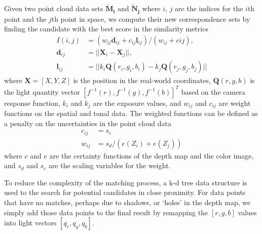 Given two point cloud data sets  $\mathbf{\tilde{M}_{i}}$ and $\mathbf{\tilde{N}_{j}}$ where $i$, $j$ are the indices for the $i$th point and the $j$th point in space, we compute their new correspondence sets by finding the candidate with the best score in the similarity metrics 
\begin{equation}
\label{eq_match_3d_point} 
\begin{split}
I(i,j) &= (w_{ij}\mathbf{d}_{ij} + c_{ij}\mathbf{l}_{ij})/(w_{ij} + c{ij}), \\
\mathbf{d}_{ij} &= || \mathbf{X}_i - \mathbf{X}_j ||, \\
\mathbf{l}_{ij} &= ||{k_i\mathbf{Q}(r_i,g_i,b_i)-k_j\mathbf{Q}(r_j,g_j,b_j)}||
\end{split}
\end{equation}
where $\mathbf{X}=[X, Y, Z]$ is the position in the real-world coordinates, $\mathbf{Q}(r,g,b)$ is the light quantity vector $[f^{-1}(r), f^{-1}(g), f^{-1}(b)]^T$ based on the camera response function, $k_i$ and $k_j$ are the exposure values, and $w_{ij}$ and $c_{ij}$ are weight functions on the spatial and tonal data. 
The weighted functions can be defined as a penalty on the uncertainties in the point cloud data 
\begin{equation}
\begin{split}
c_{ij} &= s_c \\
w_{ij} &= s_d/(e(Z_i) + e(Z_j))
\end{split}
\end{equation}
where $c$ and $e$ are the certainty functions of the depth map and the color image, and $s_d$ and $s_c$ are the scaling variables for the weight.

To reduce the complexity of the matching process, a k-d tree data structure is used to the search for potential candidates in close proximity. For data points that have no matches, perhaps due to shadows, or `holes' in the depth map, we simply add those data points to the final result by remapping the $[r, g, b]$ values into light vectors $[q_r, q_g, q_b]$. 



